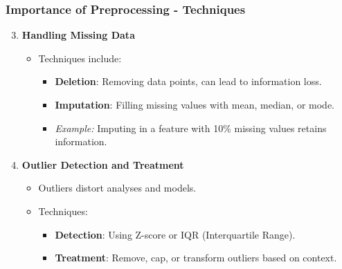 \documentclass[aspectratio=169]{beamer}
\begin{document}
\begin{frame}[fragile]
    \frametitle{Importance of Preprocessing - Techniques}
    \begin{enumerate}
        \setcounter{enumi}{2}
        \item \textbf{Handling Missing Data}
        \begin{itemize}
            \item Techniques include:
            \begin{itemize}
                \item \textbf{Deletion}: Removing data points, can lead to information loss.
                \item \textbf{Imputation}: Filling missing values with mean, median, or mode.
                \item \textit{Example:} Imputing in a feature with 10\% missing values retains information.
            \end{itemize}
        \end{itemize}
        \item \textbf{Outlier Detection and Treatment}
        \begin{itemize}
            \item Outliers distort analyses and models.
            \item Techniques:
            \begin{itemize}
                \item \textbf{Detection}: Using Z-score or IQR (Interquartile Range).
                \item \textbf{Treatment}: Remove, cap, or transform outliers based on context.
            \end{itemize}
        \end{itemize}
    \end{enumerate}
\end{frame}
\end{document}
